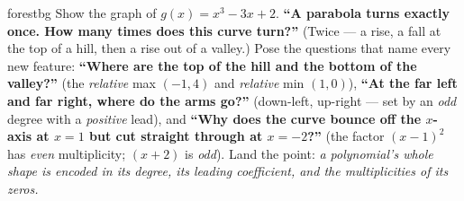 \documentclass[10pt]{article}
\begin{document}
\begin{skillbox}[Hook]{forestbg}
    Show the graph of $g(x)=x^3-3x+2$. \textbf{``A parabola turns exactly once. How many times does
    this curve turn?''} (Twice --- a rise, a fall at the top of a hill, then a rise out of a valley.)
    Pose the questions that name every new feature: \textbf{``Where are the top of the hill and the
    bottom of the valley?''} (the \emph{relative} max $(-1,4)$ and \emph{relative} min $(1,0)$),
    \textbf{``At the far left and far right, where do the arms go?''} (down-left, up-right --- set by
    an \emph{odd} degree with a \emph{positive} lead), and \textbf{``Why does the curve bounce off the
    $x$-axis at $x=1$ but cut straight through at $x=-2$?''} (the factor $(x-1)^2$ has \emph{even}
    multiplicity; $(x+2)$ is \emph{odd}). Land the point: \emph{a polynomial's whole shape is encoded
    in its degree, its leading coefficient, and the multiplicities of its zeros.}
\end{skillbox}
\end{document}
